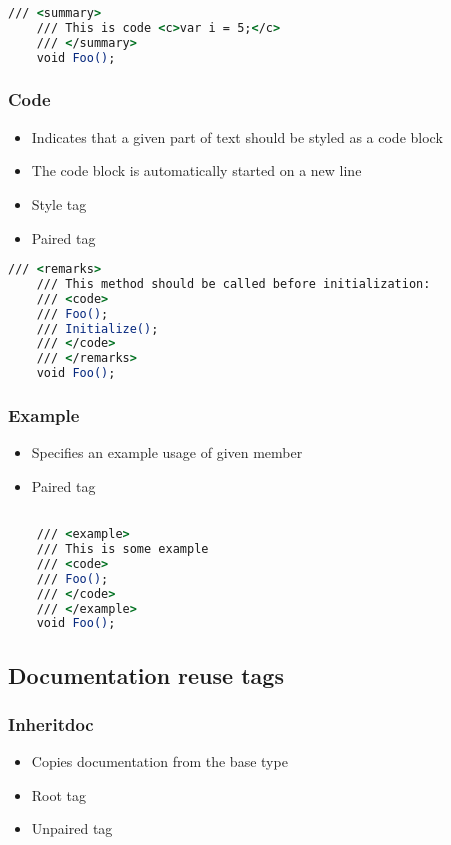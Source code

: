 \begin{lstlisting}[language=csh]
    /// <summary>
    /// This is code <c>var i = 5;</c>
    /// </summary>
    void Foo();
\end{lstlisting}

\subsubsection*{Code}
\begin{itemize}
    \item Indicates that a given part of text should be styled as a code block
    \item The code block is automatically started on a new line
    \item Style tag
    \item Paired tag
\end{itemize}

\begin{lstlisting}[language=csh]
    /// <remarks>
    /// This method should be called before initialization:
    /// <code>
    /// Foo();
    /// Initialize();
    /// </code>
    /// </remarks>
    void Foo();
\end{lstlisting}

\subsubsection*{Example}
\begin{itemize}
    \item Specifies an example usage of given member
    \item Paired tag
\end{itemize}

\begin{lstlisting}[language=csh]

    /// <example>
    /// This is some example
    /// <code>
    /// Foo();
    /// </code>
    /// </example>
    void Foo();

\end{lstlisting}

\subsection{Documentation reuse tags}

\subsubsection*{Inheritdoc} \label{sec:inheritdocTag}
\begin{itemize}
    \item Copies documentation from the base type
    \item Root tag
    \item Unpaired tag
\end{itemize}

